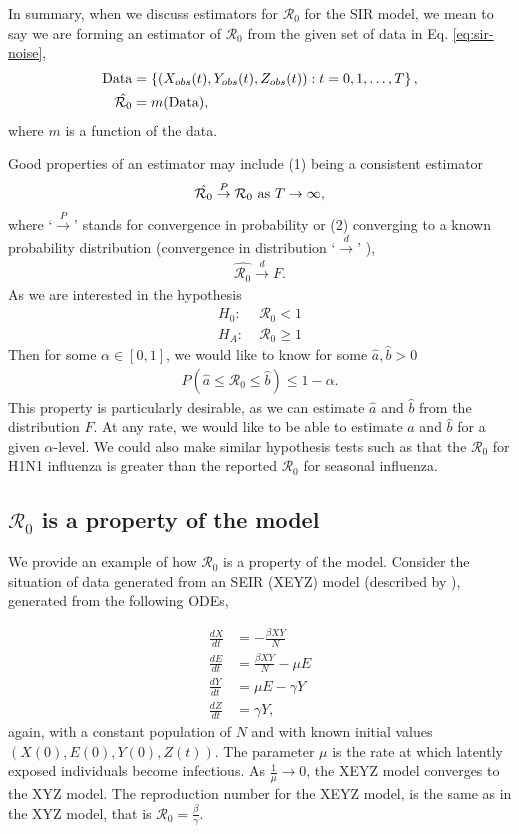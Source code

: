 \documentclass[12pt]{article}
\newcommand{\rr}{\ensuremath{\mathcal{R}_0}}
\begin{document}
In summary, when we discuss estimators for $\rr$ for the SIR model, we mean to say we are forming an estimator of $\rr$ from the given set of data in Eq. \ref{eq:sir-noise},
\begin{align*}
  \textnormal{Data} &= \left \{\left (X_{obs}(t), Y_{obs}(t), Z_{obs}(t) \right ) : t=0, 1, \dots, T\right \}, \\
  \hat{\rr} &= m(\textnormal{Data}),
\end{align*}
where $m$ is a function of the data.

Good properties of an estimator may include (1) being a consistent estimator
\begin{align*}
  \hat{\rr} \overset{P}{\to} \rr \textnormal{ as } T\to \infty,
\end{align*}
where `$\overset{P}{\to}$' stands for convergence in probability or (2) converging to a known probability distribution (convergence in distribution `$\overset{d}{\to}$' \citep{wasserman2004}),
\begin{align*}
\hat{\rr} \overset{d}{\to} F.  
\end{align*}
As we are interested in the hypothesis
\begin{align*}
  H_0:\;& \rr < 1 \\
  H_A:\;& \rr \ge 1
\end{align*}
Then for some $\alpha \in [0,1]$, we would like to know for some $\hat{a}, \hat{b} >0$
\begin{align*}
P(\hat{a} \le \rr \le \hat{b}) \le 1 - \alpha.
\end{align*}
This property is particularly desirable, as we can estimate $\hat{a}$ and $\hat{b}$ from the distribution $F$.  At any rate, we would like to be able to estimate $\hat{a}$ and $\hat{b}$ for a given $\alpha$-level.  We could also make similar hypothesis tests such as that the $\rr$ for H1N1 influenza is greater than the reported $\rr$ for seasonal influenza.

\subsection{$\rr$ is a property of the model}

We provide an example of how $\rr$ is a property of the model.  Consider the situation of data generated from an SEIR (XEYZ) model (described by \cite{cintronarias2009}), generated from the following ODEs,

\begin{align*}
  \frac{dX}{dt} &= - \frac{\beta XY}{N} \\
  \frac{dE}{dt} &= \frac{\beta XY}{N}  - \mu E\\
  \frac{dY}{dt} &= \mu E - \gamma Y \\
  \frac{dZ}{dt} &= \gamma Y,
\end{align*}
again, with a constant population of $N$ and with known initial values $(X(0), E(0), Y(0), Z(t))$.  The parameter $\mu$ is the rate at which latently exposed individuals become infectious.  As $\frac{1}{\mu} \to 0$, the XEYZ model converges to the XYZ model.  The reproduction number for the XEYZ model, is the same as in the XYZ model, that is $\rr = \frac{\beta}{\gamma}$.
\end{document}
